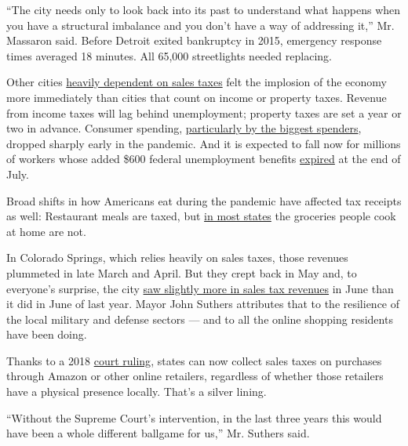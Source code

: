 ``The city needs only to look back into its past to understand what
happens when you have a structural imbalance and you don't have a way of
addressing it,'' Mr. Massaron said. Before Detroit exited bankruptcy in
2015, emergency response times averaged 18 minutes. All 65,000
streetlights needed replacing.

Other cities
\href{https://papers.ssrn.com/sol3/papers.cfm?abstract_id=3571827}{heavily
dependent on sales taxes} felt the implosion of the economy more
immediately than cities that count on income or property taxes. Revenue
from income taxes will lag behind unemployment; property taxes are set a
year or two in advance. Consumer spending,
\href{https://www.nytimes3xbfgragh.onion/2020/06/17/upshot/coronavirus-spending-rich-poor.html}{particularly
by the biggest spenders}, dropped sharply early in the pandemic. And it
is expected to fall now for millions of workers whose added \$600
federal unemployment benefits
\href{https://www.nytimes3xbfgragh.onion/2020/08/07/upshot/unemployment-benefits-racial-disparity.html}{expired}
at the end of July.

Broad shifts in how Americans eat during the pandemic have affected tax
receipts as well: Restaurant meals are taxed, but
\href{https://www.cbpp.org/research/state-budget-and-tax/states-that-still-impose-sales-taxes-on-groceries-should-consider}{in
most states} the groceries people cook at home are not.

In Colorado Springs, which relies heavily on sales taxes, those revenues
plummeted in late March and April. But they crept back in May and, to
everyone's surprise, the city
\href{https://gazette.com/business/colorado-springs-experiencing-pretty-amazing-economic-turnaround-one-indicator-shows/article_a4f2f636-db50-11ea-8417-9f40749c7ffa.html}{saw
slightly more in sales tax revenues} in June than it did in June of last
year. Mayor John Suthers attributes that to the resilience of the local
military and defense sectors --- and to all the online shopping
residents have been doing.

Thanks to a 2018
\href{https://www.nytimes3xbfgragh.onion/2018/06/21/us/politics/supreme-court-sales-taxes-internet-merchants.html}{court
ruling}, states can now collect sales taxes on purchases through Amazon
or other online retailers, regardless of whether those retailers have a
physical presence locally. That's a silver lining.

``Without the Supreme Court's intervention, in the last three years this
would have been a whole different ballgame for us,'' Mr. Suthers said.

